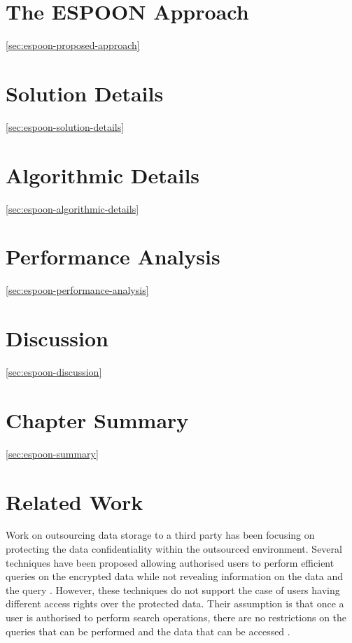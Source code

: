 \documentclass[epsfig,a4paper,11pt,titlepage]{book}
\numberwithin{algorithm}{chapter}
\begin{document}
\section{The ESPOON Approach} \ref{sec:espoon-proposed-approach}
\section{Solution Details} \ref{sec:espoon-solution-details}
\section{Algorithmic Details} \ref{sec:espoon-algorithmic-details}
\section{Performance Analysis} \ref{sec:espoon-performance-analysis}
\section{Discussion} \ref{sec:espoon-discussion}
\section{Chapter Summary} \ref{sec:espoon-summary}
\fi


\section{Related Work}
\label{sec:espoon-related-work}

Work on outsourcing data storage to a third party has been focusing on protecting the data confidentiality within the outsourced environment. Several techniques have been proposed allowing authorised users to perform efficient queries on the encrypted data while not revealing information on the data and the query \cite{Song:2000, Boneh:2004, Golle:2004, Curtmola:2006, Hwang:2007, Boneh:2007, Wang:2008, Baek:2008, Rhee:2010, Shao:2010, Dong:2011}. However, these techniques do not support the case of users having different access rights over the protected data. Their assumption is that once a user is authorised to perform search operations, there are no restrictions on the queries that can be performed and the data that can be accessed \cite{Hore:2012, Kamara:2012, Bosch:2011, Cao:2011, Li:2011, Yang:2011, Zhu:2011, Li:2010, Wang:2010, Yang:2009}.
\end{document}
